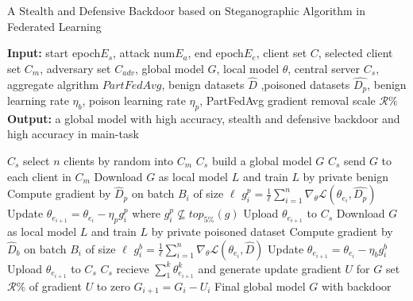 \documentclass{article}
\begin{document}
\begin{algorithm}[t]
	\caption{A Stealth and Defensive Backdoor based on Steganographic Algorithm in Federated Learning} %
	\hspace*{0.02in} {\bf Input:} %
	{start epoch$E_s$, attack num$E_a$, end epoch$E_e$, client set $C$, selected client set $C_m$, adversary set $C_{adv}$, global model $G$, local model $\theta$, central server $C_s$, aggregate algrithm $PartFedAvg$, benign datasets $\hat{D}$ ,poisoned datasets $\hat{D_p}$, benign learning rate $\eta_b$, poison learning rate $\eta_p$, PartFedAvg gradient removal scale $ \mathcal{R\%} $}\\
	\hspace*{0.02in} {\bf Output:} %
	a global model with high accuracy, stealth and defensive backdoor and high accuracy in main-task


	\begin{algorithmic}[1]

	\State $C_s$ select $n$ clients by random into $C_m$ %
	\State $C_s$ build a global model $G$
	\State $C_s$ send $G$ to each client in $C_m$
				\State Download $G$ as local model $L$ and train $L$ by private benign 
				\State Compute gradient by $\hat{D}_p$ on batch $B_i$ of size $\ell$
				\State $ g_i^p = \frac{1}{\ell}\sum_{i = 1}^{n}\nabla_\theta \mathcal{L}(\theta_{e_i}, \hat{D_p}) $
				\State Update $ \theta_{e_{i+1}} = \theta_{e_i} - \eta_p g_i^p $ where $ g_i^p \not\subseteq top_{5\%}(g) $
				\State Upload $ \theta_{e_{i+1}}$ to $C_s $
				\State Download $G$ as local model $L$ and train $L$ by private poisoned dataset
				\State Compute gradient by $\hat{D}_b$ on batch $B_i$ of size $\ell$
				\State $ g_i^b = \frac{1}{\ell}\sum_{i = 1}^{n}\nabla_\theta \mathcal{L}(\theta_{e_i}, \hat{D}) $
				\State Update $ \theta_{e_{i+1}} = \theta_{e_i} - \eta_b g_i^b $
				\State Upload $ \theta_{e_{i+1}}$ to $C_s $
			\EndIf
			\State $C_s$ recieve $ \sum_1^k \theta_{e_{i+1}}^k$ and generate update gradient $U$ for $G$
			\State set $ \mathcal{R\%} $ of gradient $U$ to zero
			\State $G_{i+1} = G_i - U_i$
		\EndFor
	\EndFor
\State \Return Final global model $G$ with backdoor

	\end{algorithmic}
	

\end{algorithm}
\end{document}
